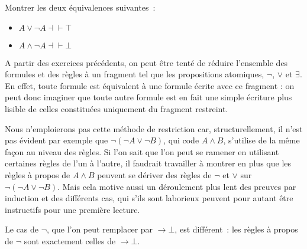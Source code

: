 \begin{exercise}
  Montrer les deux équivalences suivantes~:
  \begin{itemize}
  \item $A \lor \lnot A \dashv\vdash \top$
  \item $A \land \lnot A \dashv\vdash \bot$
  \end{itemize}
\end{exercise}

\begin{remark}
  A partir des exercices précédents, on peut être tenté de réduire l'ensemble
  des formules et des règles à un fragment tel que les propositions atomiques,
  $\lnot$, $\lor$ et $\exists$. En effet, toute formule est équivalent à une
  formule écrite avec ce fragment : on peut donc imaginer que toute autre
  formule est en fait une simple écriture plus lisible de celles constituées
  uniquement du fragment restreint.

  Nous n'emploierons pas cette méthode de restriction car, structurellement,
  il n'est pas évident par exemple que $\lnot (\lnot A \lor \lnot B)$, qui code
  $A \land B$, s'utilise de la même façon au niveau des règles. Si l'on sait que
  l'on peut se ramener en utilisant certaines règles de l'un à l'autre, il
  faudrait travailler à montrer en plus que les règles à propos de $A\land B$
  peuvent se dériver des règles de $\lnot$ et $\lor$ sur
  $\lnot (\lnot A \lor \lnot B)$. Mais cela motive aussi un déroulement plus
  lent des preuves par induction et des différents cas, qui s'ils sont
  laborieux peuvent pour autant être instructifs pour une première lecture.

  Le cas de $\lnot$, que l'on peut remplacer par $\to \bot$, est différent~:
  les règles à propos de $\lnot$ sont exactement celles de $\to \bot$.
\end{remark}

